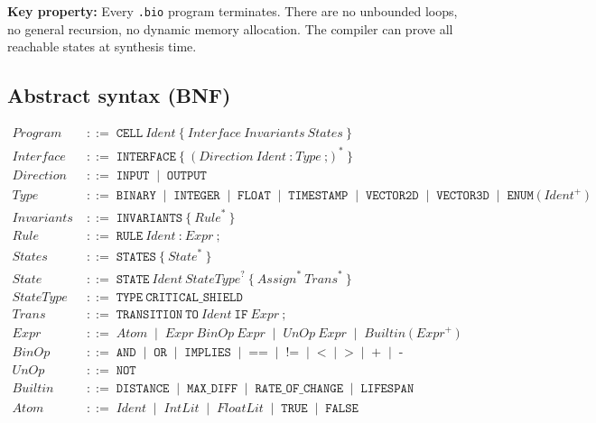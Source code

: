 \documentclass[11pt,a4paper,twoside]{article}
\newcommand{\nt}[1]{\textit{#1}}
\newcommand{\tm}[1]{\texttt{#1}}
\newcommand{\bnfor}{\;\mid\;}
\newcommand{\bnfdef}{\;{::=}\;}
\begin{document}
\begin{mdframed}[style=notebox]
\textbf{Key property:} Every \texttt{.bio} program terminates. There are no
unbounded loops, no general recursion, no dynamic memory allocation. The compiler
can prove all reachable states at synthesis time.
\end{mdframed}

\subsection{Abstract syntax (BNF)}

\vspace{4pt}
\begin{align*}
\nt{Program}   &\bnfdef \tm{CELL}\ \nt{Ident}\ \tm{\{}\ \nt{Interface}\ \nt{Invariants}\ \nt{States}\ \tm{\}} \\[3pt]
\nt{Interface}  &\bnfdef \tm{INTERFACE}\ \tm{\{}\ (\nt{Direction}\ \nt{Ident}\ \tm{:}\ \nt{Type}\ \tm{;})^*\ \tm{\}} \\
\nt{Direction}  &\bnfdef \tm{INPUT} \bnfor \tm{OUTPUT} \\
\nt{Type}       &\bnfdef \tm{BINARY} \bnfor \tm{INTEGER} \bnfor \tm{FLOAT}
                          \bnfor \tm{TIMESTAMP} \bnfor \tm{VECTOR2D}
                          \bnfor \tm{VECTOR3D} \bnfor \tm{ENUM}\ \tm{(}\ \nt{Ident}^+\ \tm{)} \\[3pt]
\nt{Invariants} &\bnfdef \tm{INVARIANTS}\ \tm{\{}\ \nt{Rule}^*\ \tm{\}} \\
\nt{Rule}       &\bnfdef \tm{RULE}\ \nt{Ident}\ \tm{:}\ \nt{Expr}\ \tm{;} \\[3pt]
\nt{States}     &\bnfdef \tm{STATES}\ \tm{\{}\ \nt{State}^*\ \tm{\}} \\
\nt{State}      &\bnfdef \tm{STATE}\ \nt{Ident}\ \nt{StateType}^?\ \tm{\{}\ \nt{Assign}^*\ \nt{Trans}^*\ \tm{\}} \\
\nt{StateType}  &\bnfdef \tm{TYPE}\ \tm{CRITICAL\_SHIELD} \\
\nt{Trans}      &\bnfdef \tm{TRANSITION}\ \tm{TO}\ \nt{Ident}\ \tm{IF}\ \nt{Expr}\ \tm{;} \\[3pt]
\nt{Expr}       &\bnfdef \nt{Atom} \bnfor \nt{Expr}\ \nt{BinOp}\ \nt{Expr}
                          \bnfor \nt{UnOp}\ \nt{Expr}
                          \bnfor \nt{Builtin}\ \tm{(}\ \nt{Expr}^+\ \tm{)} \\
\nt{BinOp}      &\bnfdef \tm{AND} \bnfor \tm{OR} \bnfor \tm{IMPLIES}
                          \bnfor \tm{==} \bnfor \tm{!=} \bnfor \tm{<}
                          \bnfor \tm{>} \bnfor \tm{+} \bnfor \tm{-} \\
\nt{UnOp}       &\bnfdef \tm{NOT} \\
\nt{Builtin}    &\bnfdef \tm{DISTANCE} \bnfor \tm{MAX\_DIFF}
                          \bnfor \tm{RATE\_OF\_CHANGE} \bnfor \tm{LIFESPAN} \\
\nt{Atom}       &\bnfdef \nt{Ident} \bnfor \nt{IntLit} \bnfor \nt{FloatLit}
                          \bnfor \tm{TRUE} \bnfor \tm{FALSE}
\end{align*}
\end{document}
